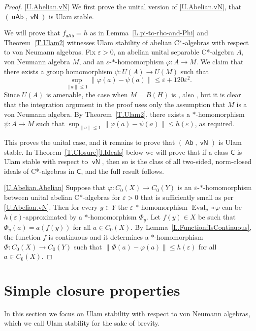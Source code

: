 \documentclass[11pt]{amsproc}
\DeclareMathOperator{\Eval}{Eval}
\newcommand{\cstar}{C*}
\newcommand{\sfC}{\mathsf C}
\DeclareMathOperator{\sfvN}{\mathsf {vN}}
\DeclareMathOperator{\sfUC}{\mathsf {uAb}}
\DeclareMathOperator{\sfCOM}{\mathsf {Ab}}
\theoremstyle{definition}
\theoremstyle{plain}
\theoremstyle{remark}
\begin{document}
\begin{proof} \eqref{U.Abelian.vN} 
	We first prove the unital version of \eqref{U.Abelian.vN}, that $(\sfUC, \sfvN)$ is Ulam stable. 
	
	We will prove that $f_{\sfUC}=h$ as in Lemma~\ref{L.pi-to-rho-and-Phi} and Theorem~\ref{T.Ulam2} witnesses Ulam stability of abelian \cstar-algebras with respect to von Neumann algebras. 
	 Fix $\varepsilon>0$, an abelian unital separable \cstar-algebra $A$, von Neumann algebra $M$,  and an $\varepsilon$-$*$-homomorphism $\varphi\colon A \to M$. 
We claim that there exists a group homomorphism $\psi\colon U(A)\to U(M)$ such that
\[\sup_{\|a\|\le 1}\|\varphi(a)-\psi(a)\|\le \varepsilon+120\varepsilon^2.\]
Since $U(A)$ is amenable, the case when $M=B(H)$ is 
\cite[Theorem~2.1]{BMT}, also \cite{Kaz:epsilon}, but it is clear that the integration argument in the proof uses only the assumption that $M$ is a von Neumann algebra. 
By Theorem~\ref{T.Ulam2}, 
 there exists a $*$-homomorphism $\psi\colon A\to M$ such that
$\sup_{\|a\|\le 1}\|\varphi(a)-\psi(a)\|\le h(\varepsilon)$, as required. 

This proves the unital case, and 
it remains to prove that $(\sfCOM,\sfvN)$ is Ulam stable. 
In Theorem~\ref{T.Closure}\eqref{I.Ideals} below we will prove that if a class $\sfC$ is Ulam stable with respect to $\sfvN$, then so is the class of all two-sided, norm-closed ideals of \cstar-algebras in $\sfC$, and the full result  follows.   


\eqref{U.Abelian.Abelian}
Suppose that $\varphi\colon C_0(X)\to C_0(Y)$ is an $\varepsilon$-$*$-homomorphism between unital abelian \cstar-algebras for  $\varepsilon>0$ that is sufficiently small as per \eqref{U.Abelian.vN}. Then  for every $y\in Y$  the $\varepsilon$-$*$-homomorphism $\Eval_y\circ \varphi$ can be $h(\varepsilon)$-approximated by a $*$-homomorphism $\Phi_y$. Let $f(y)\in X$ be such that $\Phi_y(a)=a(f(y))$ for all $a\in C_0(X)$. By Lemma~\ref{L.FunctionfIsContinuous}, the function $f$ is continuous and it determines a $*$-homomorphism $\Phi\colon C_0(X)\to C_0(Y)$ such that $\|\Phi(a)-\varphi(a)\|\leq h(\varepsilon)$ for all $a\in C_0(X)$. 
\end{proof}

\section{Simple closure properties}\label{S.SimpleClosure}

In this section we focus on Ulam stability with respect to von Neumann algebras,  which we call Ulam stability for the sake of brevity.
\end{document}
